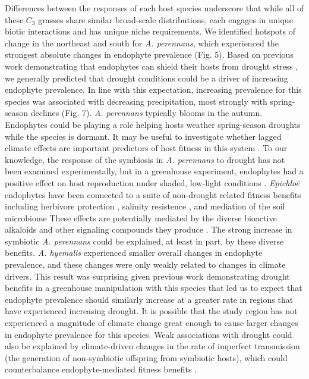 \documentclass[11pt]{article}
\let\cite\citep
\begin{document}
Differences between the responses of each host species underscore that while all of these $C_3$ grasses share similar broad-scale distributions, each engages in unique biotic interactions and has unique niche requirements.
We identified hotspots of change in the northeast and south for \emph{A. perennans}, which experienced the strongest absolute changes in endophyte prevalence (Fig. 5). 
Based on previous work demonstrating that endophytes can shield their hosts from drought stress \cite{decunta2021systematic}, we generally predicted that drought conditions could be a driver of increasing endophyte prevalence. 
In line with this expectation, increasing prevalence for this species was associated with decreasing precipitation, most strongly with spring-season declines (Fig. 7). 
\emph{A. perennans} typically blooms in the autumn.
Endophytes could be playing a role helping hosts weather spring-season droughts while the species is dormant. 
It may be useful to investigate whether lagged climate effects are important predictors of host fitness in this system \cite{evers2021lagged}. 
To our knowledge, the response of the symbiosis in \emph{A. perennans} to drought has not been examined experimentally, but in a greenhouse experiment, endophytes had a positive effect on host reproduction under shaded, low-light conditions \citep{davitt2010costs}. 
\emph{Epichloë} endophytes have been connected to a suite of non-drought related fitness benefits including herbivore protection \citep{brem2001epichloe}, salinity resistence \citep{wang2020effects}, and mediation of the soil microbiome \citep{roberts2015rhizosphere} 
These effects are potentially mediated by the diverse bioactive alkaloids and other signaling compounds they produce \citep{saikkonen2013chemical}.
The strong increase in symbiotic \emph{A. perennans} could be explained, at least in part, by these diverse benefits. 
\emph{A. hyemalis} experienced smaller overall changes in endophyte prevalence, and these changes were only weakly related to changes in climate drivers. 
This result was surprising given previous work demonstrating drought benefits in a greenhouse manipulation with this species \citep{davitt2011understanding} that led us to expect  that endophyte prevalence should similarly increase at a greater rate in regions that have experienced increasing drought.
It is possible that the study region has not experienced a magnitude of climate change great enough to cause larger changes in endophyte prevalence for this species. 
Weak associations with drought could also be explained by climate-driven changes in the rate of imperfect transmission (the generation of non-symbiotic offspring from symbiotic hosts), which could counterbalance endophyte-mediated fitness benefits \citep{donald2021context}. 
\end{document}
